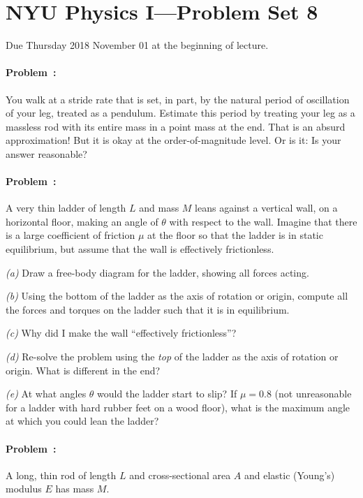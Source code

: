 \documentclass[12pt]{article}
\begin{document}
\section*{NYU Physics I---Problem Set 8}

Due Thursday 2018 November 01 at the beginning of lecture.

\paragraph{Problem~\theproblem:}%
You walk at a stride rate that is set, in part, by the natural period of
oscillation of your leg, treated as a pendulum.  Estimate this
period by treating your leg as a massless rod with its entire mass in a point mass at
the end. That is an absurd approximation! But it is okay at the order-of-magnitude
level. Or is it: Is your answer reasonable?

\paragraph{Problem~\theproblem:}%
A very thin ladder of length $L$ and mass $M$ leans against a vertical
wall, on a horizontal floor, making an angle of $\theta$ with respect
to the wall.  Imagine that there is a large coefficient of friction
$\mu$ at the floor so that the ladder is in static
equilibrium, but assume that the wall is effectively frictionless.

\textsl{(a)} Draw a free-body diagram for the ladder, showing all
forces acting.

\textsl{(b)} Using the bottom of the ladder as the axis of rotation or
origin, compute all the forces and torques on the ladder such that it
is in equilibrium.

\textsl{(c)} Why did I make the wall ``effectively frictionless''?

\textsl{(d)} Re-solve the problem using the \emph{top} of the ladder
as the axis of rotation or origin.  What is different in the end?

\textsl{(e)} At what angles $\theta$ would the ladder start to slip?
If $\mu=0.8$ (not unreasonable for a ladder with hard rubber feet on a wood
floor), what is the maximum angle at which you could lean the ladder?

\paragraph{Problem~\theproblem:}%
A long, thin rod of length $L$ and cross-sectional area $A$ and
elastic (Young's) modulus $E$ has mass $M$.
\end{document}
